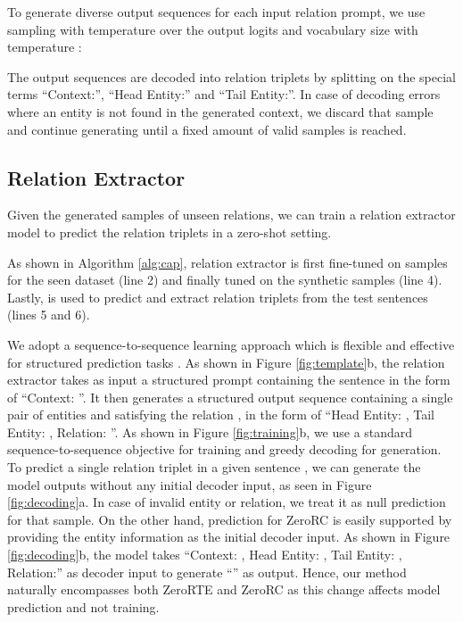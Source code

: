 \documentclass[11pt]{article}
\newcommand{\flag}[1]{#1}
\begin{document}
To generate diverse output sequences for each input relation prompt, we use sampling with temperature  \cite{Hinton2015DistillingTK} over the output logits  and vocabulary size  with temperature :

The output sequences are decoded into relation triplets by splitting on the special terms ``Context:'', ``Head Entity:'' and ``Tail Entity:''.
In case of decoding errors where an entity is not found in the generated context, we discard that sample and continue generating until a fixed amount of valid samples is reached.





\subsection{Relation Extractor}
Given the generated samples of unseen relations, we can train a relation extractor model  to predict the relation triplets in a zero-shot setting.
\flag{
As shown in Algorithm \ref{alg:cap}, relation extractor  is first fine-tuned on samples for the seen dataset  (line 2) and finally tuned on the synthetic samples  (line 4).
Lastly,  is used to predict and extract relation triplets  from the test sentences  (lines 5 and 6).
}
We adopt a sequence-to-sequence learning approach which is flexible and effective for structured prediction tasks \cite{cui2021template, paolini2020structured}.
As shown in Figure \ref{fig:template}b, the relation extractor takes as input a structured prompt containing the sentence  in the form of ``Context: ''. 
It then generates a structured output sequence containing a single pair of entities  and  satisfying the relation , in the form of ``Head Entity: , Tail Entity: , Relation: ''.
As shown in Figure \ref{fig:training}b, we use a standard sequence-to-sequence objective \cite{lewis2020bart} for training and greedy decoding for generation.
To predict a single relation triplet in a given sentence , we can generate the model outputs without any initial decoder input, as seen in Figure \ref{fig:decoding}a. 
In case of invalid entity or relation, we treat it as null prediction for that sample.
On the other hand, prediction for ZeroRC is easily supported by providing the entity information as the initial decoder input.
As shown in Figure \ref{fig:decoding}b, the model takes ``Context: , Head Entity: , Tail Entity: , Relation:'' as decoder input to generate ``'' as output.
Hence, our method naturally encompasses both ZeroRTE and ZeroRC as this change affects model prediction and not training.
 
\end{document}
